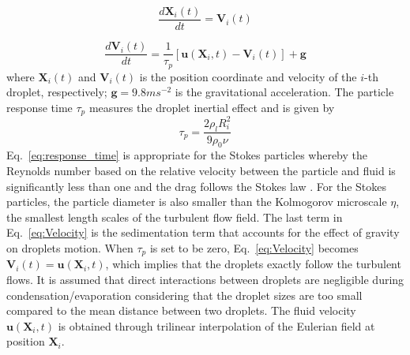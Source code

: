 \documentclass[draft,linenumbers]{agujournal}
\newcommand{\Eq}[1]{Eq.~\eqref{#1}}
\begin{document}
\begin{equation}
\frac{d\mathbf{X}_i(t)}{dt}=\mathbf{V}_i(t)\label{eq:Coords}
\end{equation}


\begin{equation}
\frac{d\mathbf{V}_i(t)}{dt}=\frac{1}{\tau_{p}}[\mathbf{u}(\mathbf{X}_i,t)-\mathbf{V}_i(t)]+\mathbf{g}\label{eq:Velocity}
\end{equation}
where {\color{green}$\mathbf{X}_i(t)$ and $\mathbf{V}_i(t)$ is the position coordinate and velocity of the $i$-th droplet, respectively; $\mathbf{g} = 9.8 m s^{-2}$ is the gravitational acceleration.} The particle response time $\tau_p$ measures the droplet inertial effect and is given by
\begin{equation}
\tau_{p}=\frac{2\rho_{l}R_i^{2}}{9\rho_{0}\nu}
\label{eq:response_time}
\end{equation}
\Eq{eq:response_time} is appropriate for the Stokes particles whereby the Reynolds number 
based on the relative velocity between the particle and fluid is significantly less than one and the 
drag follows the Stokes law \citep{Eaton94}. For the Stokes particles, the particle diameter is also smaller than the Kolmogorov microscale $\eta$, the smallest length scales of the turbulent flow field.
The last term in \Eq{eq:Velocity} is the sedimentation term that accounts for the effect of 
gravity on droplets motion. When $\tau_{p}$ is set to be zero, \Eq{eq:Velocity} becomes $\mathbf{V}_i(t)=\mathbf{u}(\mathbf{X}_i,t)$, 
which implies that the droplets exactly follow the turbulent flows. 
It is assumed that direct interactions between droplets are negligible during 
condensation/evaporation considering that the droplet sizes are too small compared to the mean distance between two droplets. The fluid velocity $\mathbf{u}(\mathbf{X}_i, t)$ 
is obtained through {\color{green}trilinear} interpolation of the Eulerian field at position $\mathbf{X}_i$.
\end{document}
